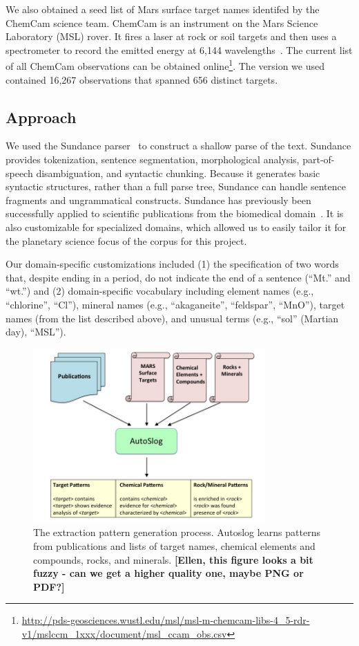 \documentclass[letterpaper]{article}
\begin{document}
We also obtained a seed list of Mars surface target names identifed by
the ChemCam science team.  ChemCam is an instrument on the Mars
Science Laboratory (MSL) rover.  It fires a laser at rock or soil targets
and then uses a spectrometer to record the emitted energy at 6,144
wavelengths~\cite{maurice:chemcam12}.  The current list of all ChemCam
observations can be obtained
online\footnote{\url{http://pds-geosciences.wustl.edu/msl/msl-m-chemcam-libs-4_5-rdr-v1/mslccm_1xxx/document/msl_ccam_obs.csv}}.
The version we used contained 16,267 observations that spanned 656
distinct targets.

\subsection{Approach}

We used the Sundance parser~\cite{riloff:sundance04} to construct a
shallow parse of the text.  Sundance provides tokenization, sentence
segmentation, morphological analysis, part-of-speech disambiguation,
and syntactic chunking.  Because it generates basic syntactic
structures, rather than a full parse tree, Sundance can handle
sentence fragments and ungrammatical constructs.  Sundance has
previously been successfully applied to scientific publications from
the biomedical domain~\cite{ramakrishnan:bio10,pokkunuri:bio11}.  It
is also customizable for specialized domains, which allowed us to
easily tailor it for the planetary science focus of the corpus for
this project.

Our domain-specific customizations included (1) the specification of
two words that, despite ending in a period, do not indicate the end of
a sentence (``Mt.'' and ``wt.'') and (2) domain-specific vocabulary
including element names (e.g., ``chlorine'', ``Cl''), mineral names
(e.g., ``akaganeite'', ``feldspar'', ``MnO''), target names (from the
list described above), and unusual terms (e.g., ``sol'' (Martian day),
``MSL''). 

\begin{figure}
\centerline{\includegraphics[width=3.5in]{fig/autoslog-process.jpg}}
\caption{The extraction pattern generation process. Autoslog learns
patterns from publications and lists of target names, chemical
elements and compounds, rocks, and minerals. {\bf [Ellen, this figure
looks a bit fuzzy - can we get a higher quality one, maybe PNG or PDF?]}}
\label{fig:ie}
\end{figure}
\end{document}
